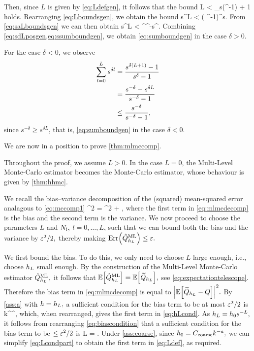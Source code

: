 Then, since $L$ is given by \eqref{eq:Ldefgen}, it follows that the bound
\beq\label{eq:Lboundsgen}
L < \Lconst\log_s\mleft(\func \eps^{-1}\mright) + 1
\eeq
holds. Rearranging \eqref{eq:Lboundsgen}, we obtain the bound
\beq\label{eq:saLboundsgen}
s^{L} < \mleft( \func\eps^{-1}\mright)^{\Lconst}s.
\eeq
From \eqref{eq:saLboundsgen} we can then obtain
\beq\label{eq:sdLposgen}
s^{\delta L} < \func^{\delta\Lconst}\eps^{-\delta\Lconst}s^{\delta}.
\eeq
Combining \cref{eq:sdLposgen,eq:ssumboundgen}, we obtain \cref{eq:sumboundgen} in the case $\delta > 0.$

For the case $\delta < 0$, we observe
\begin{align*}
\sum_{l=0}^L s^{\delta l} &= \frac{s^{\delta\mleft(L+1\mright)} -1}{s^{\delta}-1}\nonumber\\
&= \frac{s^{-\delta} - s^{\delta L}}{s^{-\delta}-1}\nonumber\\
&\leq \frac{s^{-\delta}}{s^{-\delta}-1},%
\end{align*}
since $s^{-\delta} \geq  s^{\delta L}$, that is, \cref{eq:sumboundgen} in the case $\delta < 0.$
\epf

We are now in a position to prove \cref{thm:mlmccomp}.

\label{page:mlmccompproof}
Throughout the proof, we assume $L>0.$ In the case $L=0$, the Multi-Level Monte-Carlo estimator becomes the Monte-Carlo estimator, whose behaviour is given by \cref{thm:hhmc}.

We recall the bias--variance decomposition of the (squared) mean-squared error analagous to \cref{eq:mccomp1}
\beq\label{eq:mlmcdecomp}
\errQhatMLhL^2 = ^2 + \VAR{\QhatMLhL},
\eeq
where the first term in \cref{eq:mlmcdecomp} is the bias and the second term is the variance.
We now proceed to choose the parameters $L$ and $N_{l},$ $l = 0,\ldots,L$, such that we can bound both the bias and the variance by $\varepsilon^2/2,$ thereby making $\err{\QhatMLhL} \leq \eps.$

We first bound the bias. To do this, we only need to choose $L$ large enough, i.e., choose $h_{L}$ small enough. By the construction of the Multi-Level Monte-Carlo estimator $\hat{Q}^{\mathrm{ML}}_{h_{L}},$ it follows that $\EXP{\QhatMLhL} = \EXP{\QhLtilde},$ see \cref{eq:expectationtelescope}. Therefore the bias term in \cref{eq:mlmcdecomp} is equal to $\abs{\EXP{\QhLtilde - Q}}^2.$ By \cref{ass:a} with $h=h_{L},$ a sufficient condition for the bias term to be at most $\varepsilon^2/2$ is
\beq\label{eq:biascondition}
\co k^\sigma \hL^\alpha \leq {},
\eeq
which, when rearranged, gives the first term in \eqref{eq:hLcond}. As $h_{L} = h_{0} s^{-L},$ it follows from rearranging \cref{eq:biascondition} that a sufficient condition for the bias term to be $\leq \varepsilon^2/2$ is
\beq\label{eq:Lcondpart}
L = .
\eeq
Under \cref{ass:coarse}, since $h_{0} = C_{\mathrm{coarse}} k^{-a},$ we can simplify \eqref{eq:Lcondpart} to obtain the first term in \eqref{eq:Ldef}, as required.


